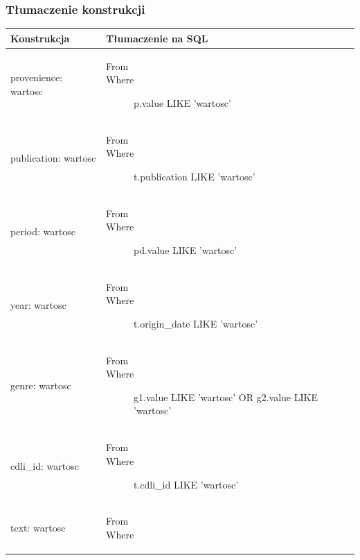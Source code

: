 \documentclass{pracamgr}
\begin{document}
\subsubsection{Tłumaczenie konstrukcji}
\begin{longtable}{|p{3in}|p{3in}|}
\hline
{\bf Konstrukcja} & {\bf Tłumaczenie na SQL}\\
\hline
\endhead
provenience: wartosc & \begin{description}
     \item[From] 
     \item[Where] p.value LIKE 'wartosc'
     \end{description}\\
\hline
publication: wartosc & 
\begin{description}
     \item[From]
     \item[Where] t.publication LIKE 'wartosc'
     \end{description}\\
\hline
period: wartosc & 
\begin{description}
     \item[From]
     \item[Where] pd.value LIKE 'wartosc'
     \end{description}\\
\hline
year: wartosc & \begin{description}
     \item[From]
     \item[Where] t.origin\_date LIKE 'wartosc'
     \end{description}\\
\hline
genre: wartosc & \begin{description}
     \item[From]
     \item[Where] g1.value LIKE 'wartosc' OR g2.value LIKE 'wartosc'
     \end{description}\\
\hline
cdli\_id: wartosc & \begin{description}
     \item[From]
     \item[Where] t.cdli\_id LIKE 'wartosc'
     \end{description}
\\
\hline
text: wartosc & \begin{description}
     \item[From]
     \item[Where] 
     \end{description}
\\
\hline
\end{longtable}
\end{document}
